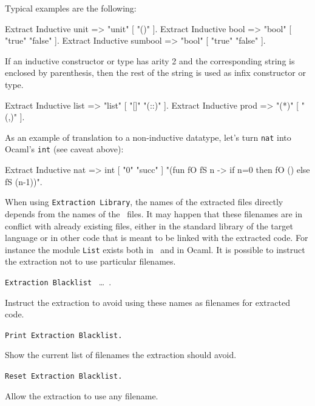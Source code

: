 \Example
Typical examples are the following:
\begin{coq_example}
Extract Inductive unit => "unit" [ "()" ].
Extract Inductive bool => "bool" [ "true" "false" ].
Extract Inductive sumbool => "bool" [ "true" "false" ].
\end{coq_example}

\noindent If an inductive constructor or type has arity 2 and the corresponding 
string is enclosed by parenthesis, then the rest of the string is used
as infix constructor or type. 
\begin{coq_example}
Extract Inductive list => "list" [ "[]" "(::)" ].
Extract Inductive prod => "(*)"  [ "(,)" ].
\end{coq_example}

\noindent As an example of translation to a non-inductive datatype, let's turn
{\tt nat} into Ocaml's {\tt int} (see caveat above):
\begin{coq_example}
Extract Inductive nat => int [ "0" "succ" ]
 "(fun fO fS n -> if n=0 then fO () else fS (n-1))".
\end{coq_example}



When using {\tt Extraction Library}, the names of the extracted files
directly depends from the names of the \Coq\ files. It may happen that
these filenames are in conflict with already existing files, 
either in the standard library of the target language or in other
code that is meant to be linked with the extracted code. 
For instance the module {\tt List} exists both in \Coq\ and in Ocaml.
It is possible to instruct the extraction not to use particular filenames.

\begin{description}
\item{\tt Extraction Blacklist} \ident\ \dots\ \ident. ~\par
  Instruct the extraction to avoid using these names as filenames
  for extracted code. 
\item{\tt Print Extraction Blacklist.} ~\par
  Show the current list of filenames the extraction should avoid.
\item{\tt Reset Extraction Blacklist.} ~\par
  Allow the extraction to use any filename.
\end{description}

